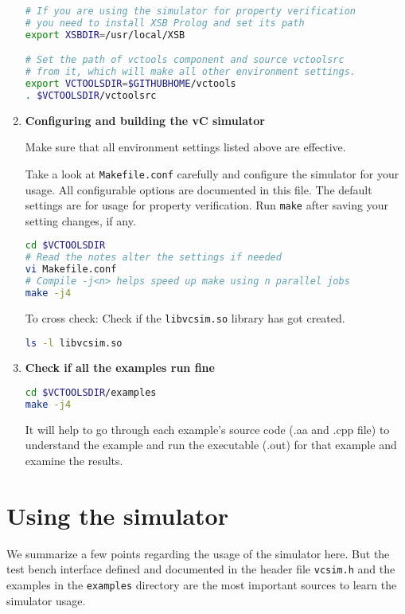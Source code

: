 \documentclass[12pt,a4paper]{article}
\begin{document}
\begin{enumerate}
\begin{lstlisting}[language=bash,style=snippet]
# If you are using the simulator for property verification
# you need to install XSB Prolog and set its path
export XSBDIR=/usr/local/XSB

# Set the path of vctools component and source vctoolsrc
# from it, which will make all other environment settings.
export VCTOOLSDIR=$GITHUBHOME/vctools
. $VCTOOLSDIR/vctoolsrc
\end{lstlisting}

\item \textbf{Configuring and building the vC simulator}

Make sure that all environment settings listed above are effective.

Take a look at \texttt{Makefile.conf} carefully and configure the simulator for your usage. All configurable options are documented in this file. The default settings are for usage for property verification. Run \texttt{make} after saving your setting changes, if any.

\begin{lstlisting}[language=bash,style=snippet]
cd $VCTOOLSDIR
# Read the notes alter the settings if needed
vi Makefile.conf
# Compile -j<n> helps speed up make using n parallel jobs
make -j4
\end{lstlisting}

To cross check: Check if the \texttt{libvcsim.so} library has got created.
\begin{lstlisting}[language=bash,style=snippet]
ls -l libvcsim.so
\end{lstlisting}

\item \textbf{Check if all the examples run fine}


\begin{lstlisting}[language=bash,style=snippet]
cd $VCTOOLSDIR/examples
make -j4
\end{lstlisting}

It will help to go through each example's source code (.aa and .cpp file) to understand the example and run the executable (.out) for that example and examine the results.

\end{enumerate}

\clearpage
\section{Using the simulator} \label{Sec:Usage}

We summarize a few points regarding the usage of the simulator here. But the test bench interface defined and documented in the header file \texttt{vcsim.h} and the examples in the \texttt{examples} directory are the most important sources to learn the simulator usage.
\end{document}
